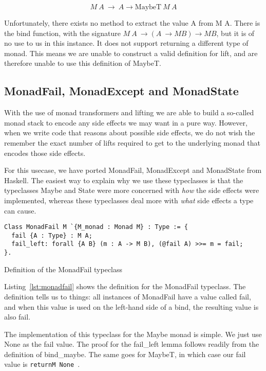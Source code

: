 \begin{equation}
    M\ A\ \rightarrow\ A \rightarrow \text{MaybeT}\ M\ A
\end{equation}

Unfortunately, there exists no method to extract the value A from M A. There is
the bind function, with the signature 
$M\ A\ \rightarrow (A\ \rightarrow M B) \rightarrow M B$, but it is of no use
to us in this instance. It does not support returning a different type of
monad. This means we are unable to construct a valid definition for lift, and
are therefore unable to use this definition of MaybeT.

\subsection{MonadFail, MonadExcept and MonadState}
With the use of monad transformers and lifting we are able to build a so-called 
monad stack to encode any side effects we may want in a pure way. However, when
we write code that reasons about possible side effects, we do not wish the
remember the exact number of lifts required to get to the underlying monad that
encodes those side effects. 

For this usecase, we have ported MonadFail, MonadExcept and MonadState from
Haskell. The easiest way to explain why we use these typeclasses is that 
the typeclasses Maybe and State were more concerned with
\textit{how} the side effects were implemented, whereas these typeclasses deal 
more with \textit{what} side effects a type can cause.

\begin{listing}
\begin{verbatim}
Class MonadFail M `{M_monad : Monad M} : Type := {
  fail {A : Type} : M A;
  fail_left: forall {A B} (m : A -> M B), (@fail A) >>= m = fail;
}.
\end{verbatim}
\caption{Definition of the MonadFail typeclass}
\label{lst:monadfail}
\end{listing}

Listing~\ref{lst:monadfail} shows the definition for the MonadFail typeclass.
The definition tells us to things: all instances of MonadFail have a value
called fail, and when this value is used on the left-hand side of a bind, the
resulting value is also fail.

The implementation of this typeclass for the Maybe monad is simple. We just use
None as the fail value. The proof for the fail\_left lemma follows readily from
the definition of bind\_maybe. The same goes for MaybeT, in which case our fail
value is \texttt{returnM None }.


